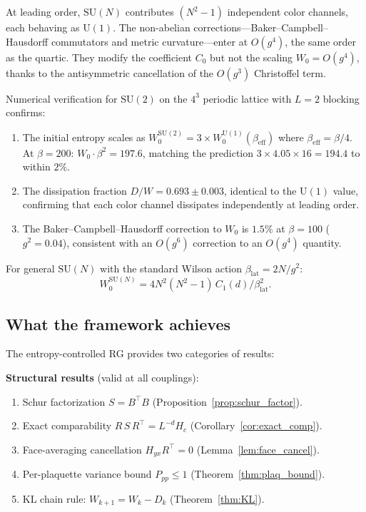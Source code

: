 \documentclass[11pt]{article}
\theoremstyle{definition}
\begin{document}
At leading order, $\mathrm{SU}(N)$ contributes $(N^2 - 1)$ independent 
color channels, each behaving as $\mathrm{U}(1)$.  The non-abelian 
corrections---Baker--Campbell--Hausdorff commutators and metric 
curvature---enter at $O(g^4)$, the same order as the quartic.  
They modify the coefficient $C_0$ but not the scaling $W_0 = O(g^4)$, 
thanks to the antisymmetric cancellation of the $O(g^3)$ Christoffel term.

Numerical verification for $\mathrm{SU}(2)$ on the $4^3$ periodic lattice 
with $L = 2$ blocking confirms:
\begin{enumerate}
\item The initial entropy scales as $W_0^{\mathrm{SU}(2)} = 3 \times 
  W_0^{\mathrm{U}(1)}(\beta_{\mathrm{eff}})$ where 
  $\beta_{\mathrm{eff}} = \beta/4$.  At $\beta = 200$: 
  $W_0 \cdot \beta^2 = 197.6$, matching the prediction 
  $3 \times 4.05 \times 16 = 194.4$ to within $2\%$.

\item The dissipation fraction $D/W = 0.693 \pm 0.003$, identical to the 
  $\mathrm{U}(1)$ value, confirming that each color channel dissipates 
  independently at leading order.

\item The Baker--Campbell--Hausdorff correction to $W_0$ is $1.5\%$ at 
  $\beta = 100$ ($g^2 = 0.04$), consistent with an $O(g^6)$ correction 
  to an $O(g^4)$ quantity.
\end{enumerate}

For general $\mathrm{SU}(N)$ with the standard Wilson action 
$\beta_{\mathrm{lat}} = 2N/g^2$:
\[
  W_0^{\mathrm{SU}(N)} = 4N^2(N^2 - 1)\,C_1(d) / \beta_{\mathrm{lat}}^2.
\]

\subsection{What the framework achieves}

The entropy-controlled RG provides two categories of results:

\textbf{Structural results} (valid at all couplings):
\begin{enumerate}
\item Schur factorization $S = B^\top B$ (Proposition~\ref{prop:schur_factor}).
\item Exact comparability $R\,S\,R^\top = L^{-d}H_c$ 
  (Corollary~\ref{cor:exact_comp}).
\item Face-averaging cancellation $H_{yx}R^\top = 0$ 
  (Lemma~\ref{lem:face_cancel}).
\item Per-plaquette variance bound $P_{pp} \leq 1$ 
  (Theorem~\ref{thm:plaq_bound}).
\item KL chain rule: $W_{k+1} = W_k - D_k$ (Theorem~\ref{thm:KL}).
\end{enumerate}
\end{document}
